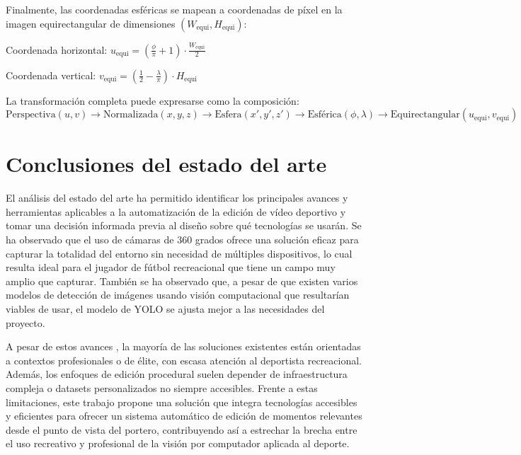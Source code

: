 Finalmente, las coordenadas esféricas se mapean a coordenadas de píxel en la imagen equirectangular de dimensiones $(W_{\text{equi}}, H_{\text{equi}})$:

Coordenada horizontal:
$u_{\text{equi}} = \left(\frac{\phi}{\pi} + 1\right) \cdot \frac{W_{\text{equi}}}{2}$

Coordenada vertical:
$v_{\text{equi}} = \left(\frac{1}{2} - \frac{\lambda}{\pi}\right) \cdot H_{\text{equi}}$

La transformación completa puede expresarse como la composición:
$\text{Perspectiva}(u,v) \rightarrow \text{Normalizada}(x,y,z) \rightarrow \text{Esfera}(x',y',z') \rightarrow \text{Esférica}(\phi,\lambda) \rightarrow \text{Equirectangular}(u_{\text{equi}},v_{\text{equi}})$



\section[Conclusiones]{Conclusiones del estado del arte}

El análisis del estado del arte ha permitido identificar los principales avances y herramientas aplicables a la automatización de la edición de vídeo deportivo y tomar una decisión informada previa al diseño sobre qué tecnologías se usarán. Se ha observado que el uso de cámaras de 360 grados ofrece una solución eficaz para capturar la totalidad del entorno sin necesidad de múltiples dispositivos, lo cual resulta ideal para el jugador de fútbol recreacional que tiene un campo muy amplio que capturar. También se ha observado que, a pesar de que existen varios modelos de detección de imágenes usando visión computacional que resultarían viables de usar, el modelo de YOLO se ajusta mejor a las necesidades del proyecto.

A pesar de estos avances \cite{xiong2019less}, la mayoría de las soluciones existentes están orientadas a contextos profesionales o de élite, con escasa atención al deportista recreacional. Además, los enfoques de edición procedural suelen depender de infraestructura compleja o datasets personalizados no siempre accesibles. Frente a estas limitaciones, este trabajo propone una solución que integra tecnologías accesibles y eficientes para ofrecer un sistema automático de edición de momentos relevantes desde el punto de vista del portero, contribuyendo así a estrechar la brecha entre el uso recreativo y profesional de la visión por computador aplicada al deporte.
